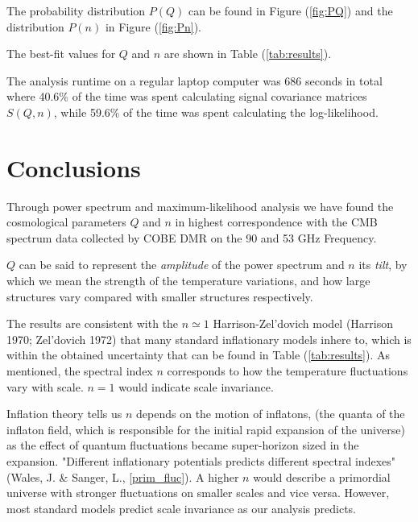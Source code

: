 \documentclass{emulateapj}
\begin{document}
The probability distribution $P(Q)$ can be found in Figure (\ref{fig:PQ}) and the distribution $P(n)$ in Figure (\ref{fig:Pn}).

The best-fit values for $Q$ and $n$ are shown in Table (\ref{tab:results}).
 
The analysis runtime on a regular laptop computer was 686 seconds in total where 40.6\% of the time was spent calculating signal covariance matrices $S(Q,n)$, while 59.6\% of the time was spent calculating the log-likelihood. 
 


\section{Conclusions}
\label{sec:conclusions}

Through power spectrum and maximum-likelihood analysis we have found the cosmological parameters $Q$ and $n$ in highest correspondence with the CMB spectrum data collected by COBE DMR on the 90 and 53 GHz Frequency. 

$Q$ can be said to represent the \textit{amplitude} of the power spectrum and $n$ its \textit{tilt}, by which we mean the strength of the temperature variations, and how large structures vary compared with smaller structures respectively.

The results are consistent with the $n \simeq 1$ Harrison-Zel'dovich model (Harrison 1970; Zel'dovich 1972) that many standard inflationary models inhere to, which is within the obtained uncertainty that can be found in Table (\ref*{tab:results}). As mentioned, the spectral index $n$ corresponds to how the temperature fluctuations vary with scale. $n = 1$ would indicate scale invariance. 

Inflation theory tells us %
$n$ depends on the motion of inflatons, (the quanta of the inflaton field, which is responsible for the initial rapid expansion of the universe) as the effect of quantum fluctuations became super-horizon sized in the expansion. "Different inflationary potentials predicts different spectral indexes" (Wales, J. \& Sanger, L., \ref{prim_fluc}). A higher $n$ would describe a primordial universe with stronger fluctuations on smaller scales and vice versa. However, most standard models predict scale invariance as our analysis predicts.
\end{document}
